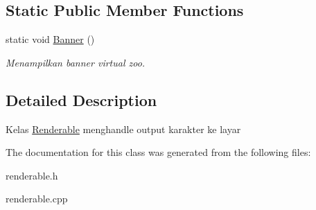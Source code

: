 \subsection*{Static Public Member Functions}
\begin{DoxyCompactItemize}
\item 
static void \hyperlink{classRenderable_a661f03228079112cc4efb46d98b9d53c}{Banner} ()\hypertarget{classRenderable_a661f03228079112cc4efb46d98b9d53c}{}\label{classRenderable_a661f03228079112cc4efb46d98b9d53c}

\begin{DoxyCompactList}\small\item\em Menampilkan banner virtual zoo. \end{DoxyCompactList}\end{DoxyCompactItemize}


\subsection{Detailed Description}
Kelas \hyperlink{classRenderable}{Renderable} menghandle output karakter ke layar 

The documentation for this class was generated from the following files\+:\begin{DoxyCompactItemize}
\item 
renderable.\+h\item 
renderable.\+cpp\end{DoxyCompactItemize}
